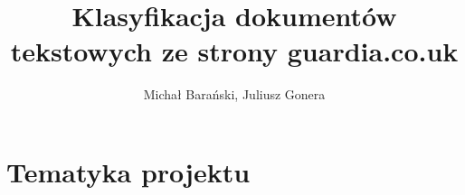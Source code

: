 \documentclass[12pt, a4paper]{article}
\author{Michał Barański, Juliusz Gonera}
\date{}
\title{Klasyfikacja dokumentów tekstowych ze strony guardia.co.uk}
\begin{document}
\maketitle

\section{Tematyka projektu}

\nocite{*}


\end{document}
